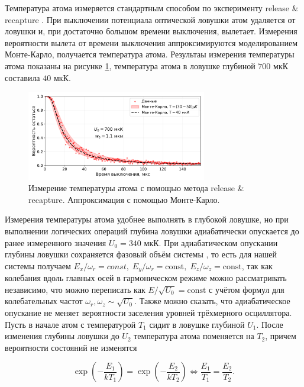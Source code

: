 Температура атома измеряется стандартным способом по эксперименту release \& recapture \cite{Tuchendler2008EnergyDA}. При выключении потенциала оптической ловушки атом удаляется от ловушки и, при достаточно большом времени выключения, вылетает. Измерения вероятности вылета от времени выключения аппроксимируются моделированием Монте-Карло, получается температура атома. Результаы измерения температуры атома показаны на рисунке \ref{fig:temperature}, температура атома в ловушке глубиной $700\text{ мкК}$ составила $40\text{ мкК}$.

\begin{figure}[ht]
	\centering
	\includegraphics[width=0.7\textwidth]{images/temperature.pdf}
	\caption{Измерение температуры атома с помощью метода release \& recapture. Аппроксимация с помощью Монте-Карло.}
	\label{fig:temperature}
\end{figure}

Измерения температуры атома удобнее выполнять в глубокой ловушке, но при выполнении логических операций глубина ловушки адиабатически опускается \cite{Tuchendler2008EnergyDA} до ранее измеренного значения $U_0 = 340\text{ мкК}$. При адиабатическом опускании глубины ловушки сохраняется фазовый объём системы \cite{LL_mechanics}, то есть для нашей системы получаем $E_{x}/\omega_r = const, \; E_{y}/\omega_r = \text{const}, \; E_{z}/\omega_z = \text{const}$, так как колебания вдоль главных осей в гармоническом режиме можно рассматривать независимо, что можно переписать как $E/\sqrt{U_0} = \text{const}$ с учётом формул для колебательных частот $\omega_r, \omega_z \sim \sqrt{U_0}$. Также можно сказать, что адиабатическое опускание не меняет вероятности заселения уровней трёхмерного осциллятора. Пусть в начале атом с температурой $T_{1}$ сидит в ловушке глубиной $U_1$. После изменения глубины ловушки до $U_{2}$ температура атома поменяется на $T_{2}$, причем вероятности состояний не изменятся 

\begin{equation}
	\exp\left(-\frac{E_{1}}{kT_{1}}\right) = \exp\left(-\frac{E_{2}}{kT_{2}}\right) \Leftrightarrow \frac{E_{1}}{T_{1}} = \frac{E_{2}}{T_{2}}.
\end{equation}

